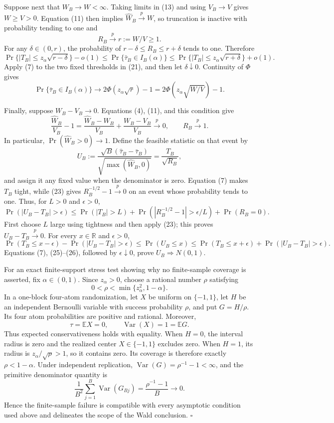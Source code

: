 Suppose next that \(W_B\to W<\infty\). Taking limits in (13) and using \(V_B\to V\) gives \(W\ge V>0\). Equation (11) then implies \(\widehat W_B\xrightarrow{p}W\), so truncation is inactive with probability tending to one and
\[
R_B\xrightarrow{p}r:=W/V\ge1.
\tag{20}
\]
For any \(\delta\in(0,r)\), the probability of \(r-\delta\le R_B\le r+\delta\) tends to one. Therefore
\[
\Pr\{|T_B|\le z_\alpha\sqrt{r-\delta}\}-o(1)
\le \Pr\{\bar\tau_B\in I_B(\alpha)\}
\le \Pr\{|T_B|\le z_\alpha\sqrt{r+\delta}\}+o(1).
\tag{21}
\]
Apply (7) to the two fixed thresholds in (21), and then let \(\delta\downarrow0\). Continuity of \(\Phi\) gives
\[
\Pr\{\bar\tau_B\in I_B(\alpha)\}
\longrightarrow
2\Phi(z_\alpha\sqrt r)-1
=2\Phi\!\left(z_\alpha\sqrt{W/V}\right)-1.
\tag{22}
\]

Finally, suppose \(W_B-V_B\to0\). Equations (4), (11), and this condition give
\[
\frac{\widehat W_B}{V_B}-1
=\frac{\widehat W_B-W_B}{V_B}
+\frac{W_B-V_B}{V_B}
\xrightarrow{p}0,
\qquad
R_B\xrightarrow{p}1.
\tag{23}
\]
In particular, \(\Pr(\widehat W_B>0)\to1\). Define the feasible statistic on that event by
\[
U_B:=\frac{\sqrt B(\widehat\tau_B-\bar\tau_B)}
{\sqrt{\max(\widehat W_B,0)}}
=\frac{T_B}{\sqrt{R_B}},
\tag{24}
\]
and assign it any fixed value when the denominator is zero. Equation (7) makes \(T_B\) tight, while (23) gives \(R_B^{-1/2}-1\xrightarrow{p}0\) on an event whose probability tends to one. Thus, for \(L>0\) and \(\epsilon>0\),
\[
\Pr(|U_B-T_B|>\epsilon)
\le \Pr(|T_B|>L)
+\Pr(|R_B^{-1/2}-1|>\epsilon/L)
+\Pr(R_B=0).
\tag{25}
\]
First choose \(L\) large using tightness and then apply (23); this proves \(U_B-T_B\xrightarrow{p}0\). For every \(x\in\mathbb R\) and \(\epsilon>0\),
\[
\Pr(T_B\le x-\epsilon)-\Pr(|U_B-T_B|>\epsilon)
\le\Pr(U_B\le x)
\le\Pr(T_B\le x+\epsilon)+\Pr(|U_B-T_B|>\epsilon).
\tag{26}
\]
Equations (7), (25)--(26), followed by \(\epsilon\downarrow0\), prove \(U_B\Rightarrow N(0,1)\).

For an exact finite-support stress test showing why no finite-sample coverage is asserted, fix \(\alpha\in(0,1)\). Since \(z_\alpha>0\), choose a rational number \(\rho\) satisfying
\[
0<\rho<\min\{z_\alpha^2,1-\alpha\}.
\tag{27}
\]
In a one-block four-atom randomization, let \(X\) be uniform on \(\{-1,1\}\), let \(H\) be an independent Bernoulli variable with success probability \(\rho\), and put \(G=H/\rho\). Its four atom probabilities are positive and rational. Moreover,
\[
\tau=\mathbb E X=0,
\qquad
\operatorname{Var}(X)=1=\mathbb E G.
\tag{28}
\]
Thus expected conservativeness holds with equality. When \(H=0\), the interval radius is zero and the realized center \(X\in\{-1,1\}\) excludes zero. When \(H=1\), its radius is \(z_\alpha/\sqrt\rho>1\), so it contains zero. Its coverage is therefore exactly \(\rho<1-\alpha\). Under independent replication, \(\operatorname{Var}(G)=\rho^{-1}-1<\infty\), and the primitive denominator quantity is
\[
\frac1{B^2}\sum_{j=1}^B\operatorname{Var}(G_{Bj})
=\frac{\rho^{-1}-1}{B}\longrightarrow0.
\tag{29}
\]
Hence the finite-sample failure is compatible with every asymptotic condition used above and delineates the scope of the Wald conclusion. \(\square\)
